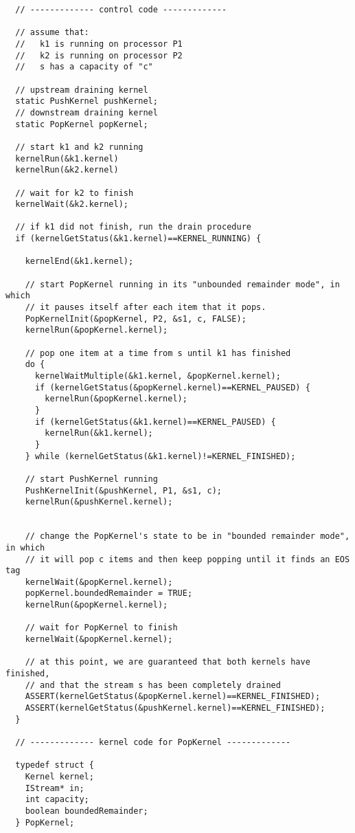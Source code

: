 {\small
\begin{verbatim}
  // ------------- control code -------------

  // assume that:
  //   k1 is running on processor P1
  //   k2 is running on processor P2
  //   s has a capacity of "c"

  // upstream draining kernel
  static PushKernel pushKernel;
  // downstream draining kernel
  static PopKernel popKernel;

  // start k1 and k2 running
  kernelRun(&k1.kernel)
  kernelRun(&k2.kernel)

  // wait for k2 to finish
  kernelWait(&k2.kernel);

  // if k1 did not finish, run the drain procedure
  if (kernelGetStatus(&k1.kernel)==KERNEL_RUNNING) {

    kernelEnd(&k1.kernel);

    // start PopKernel running in its "unbounded remainder mode", in which
    // it pauses itself after each item that it pops.
    PopKernelInit(&popKernel, P2, &s1, c, FALSE);
    kernelRun(&popKernel.kernel);

    // pop one item at a time from s until k1 has finished
    do {
      kernelWaitMultiple(&k1.kernel, &popKernel.kernel);
      if (kernelGetStatus(&popKernel.kernel)==KERNEL_PAUSED) {
        kernelRun(&popKernel.kernel);
      }
      if (kernelGetStatus(&k1.kernel)==KERNEL_PAUSED) {
        kernelRun(&k1.kernel);
      }
    } while (kernelGetStatus(&k1.kernel)!=KERNEL_FINISHED);
    
    // start PushKernel running
    PushKernelInit(&pushKernel, P1, &s1, c);
    kernelRun(&pushKernel.kernel);


    // change the PopKernel's state to be in "bounded remainder mode", in which
    // it will pop c items and then keep popping until it finds an EOS tag
    kernelWait(&popKernel.kernel);
    popKernel.boundedRemainder = TRUE;
    kernelRun(&popKernel.kernel);

    // wait for PopKernel to finish
    kernelWait(&popKernel.kernel);

    // at this point, we are guaranteed that both kernels have finished, 
    // and that the stream s has been completely drained
    ASSERT(kernelGetStatus(&popKernel.kernel)==KERNEL_FINISHED);
    ASSERT(kernelGetStatus(&pushKernel.kernel)==KERNEL_FINISHED);
  }

  // ------------- kernel code for PopKernel -------------

  typedef struct {
    Kernel kernel;
    IStream* in;
    int capacity;
    boolean boundedRemainder;
  } PopKernel;


\end{verbatim}}
